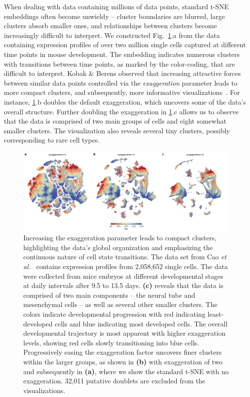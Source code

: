 \documentclass[letter]{article}
\begin{document}
When dealing with data containing millions of data points, standard t-SNE
embeddings often become unwieldy -- cluster boundaries are blurred, large
clusters absorb smaller ones, and relationships between clusters become
increasingly difficult to interpret. We constructed Fig.~\ref{fig:cao}.a from
the data containing expression profiles of over two million single cells
captured at different time points in mouse development. The embedding indicates
numerous clusters with transitions between time points, as marked by the
color-coding, that are difficult to interpret. Kobak \& Berens observed that
increasing attractive forces between similar data points controlled via the
\textit{exaggeration} parameter leads to more compact clusters, and
subsequently, more informative visualizations~\cite{kobak2019art}. For instance,
\ref{fig:cao}.b doubles the default exaggeration, which uncovers some of the
data's overall structure. Further doubling the exaggeration in \ref{fig:cao}.c
allows us to observe that the data is comprised of two main groups of cells and
eight somewhat smaller clusters. The visualization also reveals several tiny
clusters, possibly corresponding to rare cell types.

\begin{figure}[htbp]
  \includegraphics[width=\textwidth]{cao2019}
  \caption{\label{fig:cao}
  Increasing the exaggeration parameter leads to compact clusters, highlighting
	the data's global organization and emphasizing the continuous nature of
	cell state transitions. The data set from Cao \textit{et al.}~\cite{cao2019single}
	contains expression profiles from 2,058,652 single cells. The data were
	collected from mice embryos at different developmental stages at daily
	intervals after 9.5 to 13.5 days. \textbf{(c)} reveals that the data is
	comprised of two main components -- the neural tube and mesenchymal
	cells -- as well as several other smaller clusters. The
	colors indicate developmental progression with red indicating
	least-developed cells and blue indicating most developed cells. The
	overall developmental trajectory is most apparent with higher
	exaggeration levels, showing red cells slowly transitioning into blue
	cells. Progressively easing the exaggeration factor uncovers finer
	clusters within the larger groups, as shown in \textbf{(b)} with
	exaggeration of two and subsequently in \textbf{(a)}, where we show the
	standard t-SNE with no exaggeration. 32,011 putative doublets are
	excluded from the visualizations.
}
\end{figure}
\end{document}
